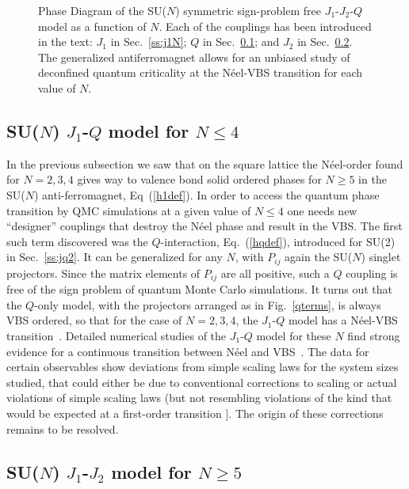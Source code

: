 \documentclass[range]{ar2e}
\begin{document}
\begin{figure}
\centerline{}
  \caption{ \label{fig:pdj1j2q} Phase Diagram of the
    SU($N$) symmetric sign-problem free
    $J_1$-$J_2$-$Q$ model as a function of $N$. Each of the couplings has been introduced
    in the text: $J_1$ in Sec.~\ref{ss:j1N}; $Q$ in Sec.~\ref{ss:jqN};
  and $J_2$ in Sec.~\ref{ss:j1j2N}. The generalized antiferromagnet
  allows for an unbiased study of deconfined quantum
  criticality at the N\'eel-VBS transition for each value of $N$. }
\end{figure}


\subsection{SU($N$) $J_1$-$Q$ model for $N\leq 4$}
\label{ss:jqN}
In the previous subsection we saw that on the square lattice the
N\'eel-order found for $N=2,3,4$ gives way to valence bond solid
ordered phases for $N\geq 5$ in the SU($N$)
anti-ferromagnet, Eq~(\ref{h1def}). In order to access the quantum
phase transition by QMC simulations at a given value of $N\leq 4$ one needs new
``designer'' couplings that
destroy the N\'eel phase and result in the VBS. The first such term discovered was
the $Q$-interaction, Eq.~(\ref{hqdef}), introduced for SU(2) in Sec.~\ref{ss:jq2}. It can be generalized for any $N$,
with $P_{ij}$ again the SU($N$) singlet projectors. Since the matrix elements of $P_{ij}$ are all positive, such a $Q$
coupling is free of the sign problem of quantum Monte Carlo simulations. It turns out that the $Q$-only model, 
with the projectors arranged as in Fig.~\ref{qterms}, is always VBS ordered, so that for the case of $N=2,3,4$, the $J_1$-$Q$ model 
has a N\'eel-VBS transition~\cite{Sandvik07,lou2009:sun}. Detailed numerical studies of the $J_1$-$Q$ model for these $N$ find strong 
evidence for a continuous transition between N\'eel and VBS~\cite{melko2008:jq,kaul2011:su34,banerjee2010:log,banerjee2010:su3}. The data 
for certain observables show deviations from simple scaling laws for the system sizes studied, that could either be due to conventional 
corrections to scaling or actual violations of simple scaling laws (but not resembling violations of the kind that would be expected
at a first-order transition \cite{Sandvik10c}]. The origin of these corrections remains to be resolved.

\subsection{SU($N$) $J_1$-$J_2$ model for $N\geq 5$}
\label{ss:j1j2N}
\end{document}
